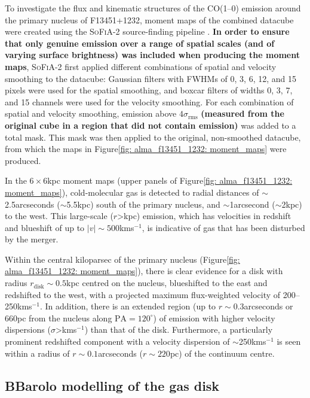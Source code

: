 To investigate the flux and kinematic structures of the CO(1--0) emission around the primary nucleus of F13451+1232, moment maps of the combined datacube were created using the \textsc{SoFiA-2} source-finding pipeline \citep{Serra2015, Serra2021}. \textbf{In order to ensure that only genuine emission over a range of spatial scales (and of varying surface brightness) was included when producing the moment maps}, \textsc{SoFiA-2} first applied different combinations of spatial and velocity smoothing to the datacube: Gaussian filters with FWHMs of 0, 3, 6, 12, and 15 pixels were used for the spatial smoothing, and boxcar filters of widths 0, 3, 7, and 15 channels were used for the velocity smoothing. For each combination of spatial and velocity smoothing, emission above $4\sigma_\mathrm{rms}$ \textbf{(measured from the original cube in a region that did not contain emission)} was added to a total mask. This mask was then applied to the original, non-smoothed datacube, from which the maps in Figure\;\ref{fig: alma_f13451_1232: moment_maps} were produced. 

In the $6\times6$\;kpc moment maps (upper panels of Figure\;\ref{fig: alma_f13451_1232: moment_maps}), cold-molecular gas is detected to radial distances of $\sim$2.5\;arcseconds ($\sim$5.5\;kpc) south of the primary nucleus, and $\sim$1\;arcsecond ($\sim$2\;kpc) to the west. This large-scale ($r$\;\textgreater{}\;kpc) emission, which has velocities in redshift and blueshift of up to $|v|\sim500$\;km\;s$^{-1}$, is indicative of gas that has been disturbed by the merger.

Within the central kiloparsec of the primary nucleus (Figure\;\ref{fig: alma_f13451_1232: moment_maps}), there is clear evidence for a disk with radius $r_\mathrm{disk}\sim0.5$\;kpc centred on the nucleus, blueshifted to the east and redshifted to the west, with a projected maximum flux-weighted velocity of 200--250\;km\;s$^{-1}$. In addition, there is an extended region (up to $r\sim0.3$\;arcseconds or 660\;pc from the nucleus along $\mathrm{PA}=120^\circ$) of emission with higher velocity dispersions ($\sigma$\;\textgreater{}\;km\;s$^{-1}$) than that of the disk. Furthermore, a particularly prominent redshifted component with a velocity dispersion of $\sim$250\;km\;s$^{-1}$ is seen within a radius of $r\sim0.1$\;arcseconds ($r\sim220$\;pc) of the continuum centre.


\subsection{BBarolo modelling of the gas disk}
\label{section: alma_f13451_1232: analysis_and_results: disk}


